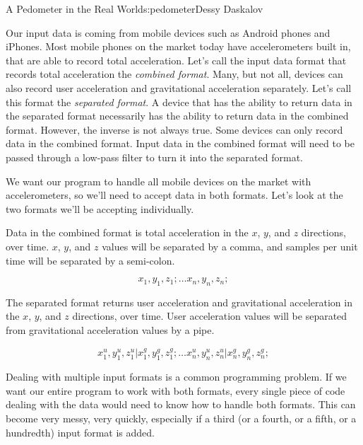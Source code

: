 \begin{aosachapter}{A Pedometer in the Real World}{s:pedometer}{Dessy Daskalov}
\label{input-formats}

Our input data is coming from mobile devices such as Android phones and
iPhones. Most mobile phones on the market today have accelerometers
built in, that are able to record total acceleration. Let's call the
input data format that records total acceleration the \emph{combined
format}. Many, but not all, devices can also record user acceleration
and gravitational acceleration separately. Let's call this format the
\emph{separated format}. A device that has the ability to return data in
the separated format necessarily has the ability to return data in the
combined format. However, the inverse is not always true. Some devices
can only record data in the combined format. Input data in the combined
format will need to be passed through a low-pass filter to turn it into
the separated format.

We want our program to handle all mobile devices on the market with
accelerometers, so we'll need to accept data in both formats. Let's look
at the two formats we'll be accepting individually.

\label{combined-format}

Data in the combined format is total acceleration in the $x$, $y$, and
$z$ directions, over time. $x$, $y$, and $z$ values will be separated by
a comma, and samples per unit time will be separated by a semi-colon.

\[
x_1,y_1,z_1; \ldots x_n,y_n,z_n;
\]

\label{separated-format}

The separated format returns user acceleration and gravitational
acceleration in the $x$, $y$, and $z$ directions, over time. User
acceleration values will be separated from gravitational acceleration
values by a pipe.

\[
x^{u}_1,y^{u}_1,z^{u}_1 \vert x^{g}_1,y^{g}_1,z^{g}_1; \ldots x^{u}_n,y^{u}_n,z^{u}_n \vert x^{g}_n,y^{g}_n,z^{g}_n;
\]

\label{i-got-multiple-input-formats-but-a-standard-aint-one}

Dealing with multiple input formats is a common programming problem. If
we want our entire program to work with both formats, every single piece
of code dealing with the data would need to know how to handle both
formats. This can become very messy, very quickly, especially if a third
(or a fourth, or a fifth, or a hundredth) input format is added.


\end{aosachapter}
